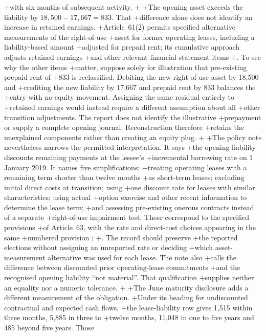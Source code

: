 +with six months of subsequent activity.
+
+The opening asset exceeds the liability by $18{,}500-17{,}667=833$. That
+difference alone does not identify an increase in retained earnings.
+Article~61(2) permits specified alternative measurements of the right-of-use
+asset for former operating leases, including a liability-based amount
+adjusted for prepaid rent; its cumulative approach adjusts retained earnings
+and other relevant financial-statement items
+\citep[attachment, art.\ 61(2)]{moflease2018}. To see why the other items
+matter, suppose solely for illustration that pre-existing prepaid rent of
+833 is reclassified. Debiting the new right-of-use asset by 18,500 and
+crediting the new liability by 17,667 and prepaid rent by 833 balances the
+entry with no equity movement. Assigning the same residual entirely to
+retained earnings would instead require a different assumption about all
+other transition adjustments. The report does not identify the illustrative
+prepayment or supply a complete opening journal. Reconstruction therefore
+retains the unexplained components rather than creating an equity plug.
+
+The policy note nevertheless narrows the permitted interpretation. It says
+the opening liability discounts remaining payments at the lessee's
+incremental borrowing rate on 1 January 2019. It names five simplifications:
+treating operating leases with a remaining term shorter than twelve months
+as short-term leases; excluding initial direct costs at transition; using
+one discount rate for leases with similar characteristics; using actual
+option exercise and other recent information to determine the lease term;
+and assessing pre-existing onerous contracts instead of a separate
+right-of-use impairment test. These correspond to the specified provisions
+of Article~63, with the rate and direct-cost choices appearing in the same
+numbered provision \citep[p.\ 113]{pingan2019asbe};
+\citep[attachment, art.\ 63]{moflease2018}. The record should preserve
+the reported elections without assigning an unreported rate or deciding
+which asset-measurement alternative was used for each lease. The note also
+calls the difference between discounted prior operating-lease commitments
+and the recognised opening liability ``not material''. That qualification
+supplies neither an equality nor a numeric tolerance.
+
+The June maturity disclosure adds a different measurement of the obligation.
+Under its heading for undiscounted contractual and expected cash flows,
+the lease-liability row gives 1,515 within three months, 5,885 in three to
+twelve months, 11,048 in one to five years and 485 beyond five years. Those
